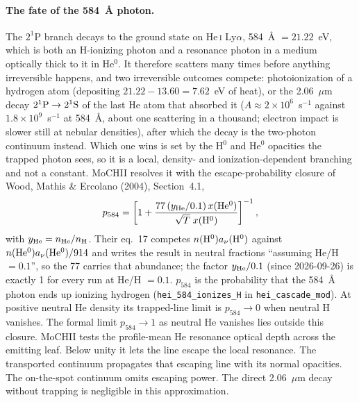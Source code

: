 \documentclass[english,a4paper]{my_memo}
\newcommand{\code}[1]{\texttt{#1}}
\begin{document}
\paragraph{The fate of the 584~\AA{} photon.}  The $2^1$P branch decays to
the ground state on He\,\textsc{i} Ly$\alpha$, 584~\AA{} $=21.22$~eV, which
is both an H-ionizing photon and a resonance photon in a medium optically
thick to it in He$^0$.  It therefore scatters many times before anything
irreversible happens, and two irreversible outcomes compete: photoionization
of a hydrogen atom (depositing $21.22-13.60 = 7.62$~eV of heat), or the
2.06~$\mu$m decay $2^1{\rm P}\rightarrow 2^1{\rm S}$ of the last He atom
that absorbed it ($A \approx 2{\times}10^6$~s$^{-1}$ against
$1.8{\times}10^9$~s$^{-1}$ at 584~\AA{}, about one scattering in a thousand;
electron impact is slower still at nebular densities), after which the decay
is the two-photon continuum instead.
Which one wins is set by the H$^0$ and He$^0$ opacities the trapped photon
sees, so it is a local, density- and ionization-dependent branching and not a
constant.  MoCHII resolves it with the escape-probability closure of Wood,
Mathis \& Ercolano (2004), Section~4.1,
\begin{equation}
 p_{584} = \left[1 + \frac{77\,(y_{\rm He}/0.1)\,x({\rm He^0})}
                          {\sqrt{T}\;x({\rm H^0})}\right]^{-1},
 \label{eq:hei-584}
\end{equation}
with $y_{\rm He} = n_{\rm He}/n_{\rm H}$.  Their eq.~17 competes
$n({\rm H^0})a_\nu({\rm H^0})$ against $n({\rm He^0})a_\nu({\rm He^0})/914$
and writes the result in neutral fractions ``assuming He/H $=0.1$'', so the
77 carries that abundance; the factor $y_{\rm He}/0.1$ (since 2026-09-26) is
exactly 1 for every run at He/H $=0.1$.  $p_{584}$ is
the probability that the 584~\AA{} photon ends up ionizing hydrogen
(\code{hei\_584\_ionizes\_H} in \code{hei\_cascade\_mod}). At positive neutral
He density its trapped-line limit is $p_{584}\to0$ when neutral H vanishes.
The formal limit $p_{584}\to1$ as neutral He vanishes lies outside this
closure. MoCHII tests the profile-mean He resonance optical depth across the
emitting leaf. Below unity it lets the line escape the local resonance.
The transported continuum propagates that escaping line with its normal
opacities. The on-the-spot continuum omits escaping power. The direct
2.06~$\mu$m decay without trapping is negligible in this approximation.
\end{document}
